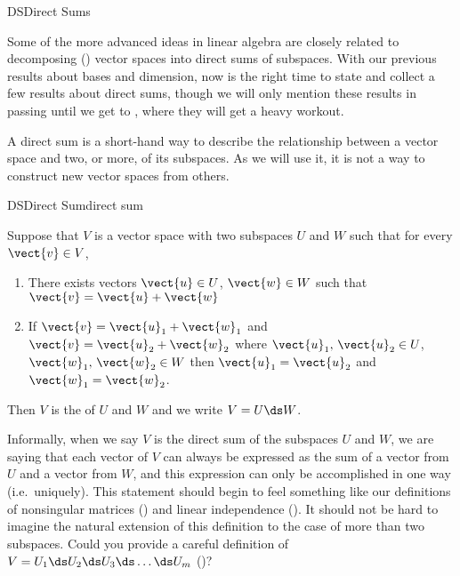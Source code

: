 \begin{subsect}{DS}{Direct Sums}
%
\begin{para}Some of the more advanced ideas in linear algebra are closely related to decomposing () vector spaces into direct sums of subspaces.  With our previous results about bases and dimension, now is the right time to state and collect a few results about direct sums, though we will only mention these results in passing until we get to , where they will get a heavy workout.\end{para}
%
\begin{para}A direct sum is a short-hand way to describe the relationship between a vector space and two, or more, of its subspaces.  As we will use it, it is not a way to construct new vector spaces from others.\end{para}
%
\begin{definition}{DS}{Direct Sum}{direct sum}
\begin{para}Suppose that $V$ is a vector space with two subspaces $U$ and $W$ such that
for every $\vect{v}\in V$,
\begin{enumerate}
\item  There exists vectors $\vect{u}\in U$, $\vect{w}\in W$ such that $\vect{v}=\vect{u}+\vect{w}$
%
\item If $\vect{v}=\vect{u}_1+\vect{w}_1$ and $\vect{v}=\vect{u}_2+\vect{w}_2$ where $\vect{u}_1,\,\vect{u}_2\in U$, $\vect{w}_1,\,\vect{w}_2\in W$ then $\vect{u}_1=\vect{u}_2$ and $\vect{w}_1=\vect{w}_2$.
\end{enumerate}
\end{para}
%
\begin{para}Then $V$ is the  of $U$ and $W$ and we write $V=U\ds W$.\end{para}
\end{definition}
%
\begin{para}Informally, when we say $V$ is the direct sum of the subspaces $U$ and $W$, we are saying that each vector of $V$ can always be expressed as the sum of a vector from $U$ and a vector from $W$, and this expression can only be accomplished in one way (i.e.\ uniquely).  This statement should begin to feel something like our definitions of nonsingular matrices () and linear independence ().   It should not be hard to imagine the natural extension of this definition to the case of more than two subspaces.  Could you provide a careful definition of  $V=U_1\ds U_2\ds U_3\ds \dots\ds U_m$ ()?\end{para}

\end{subsect}
